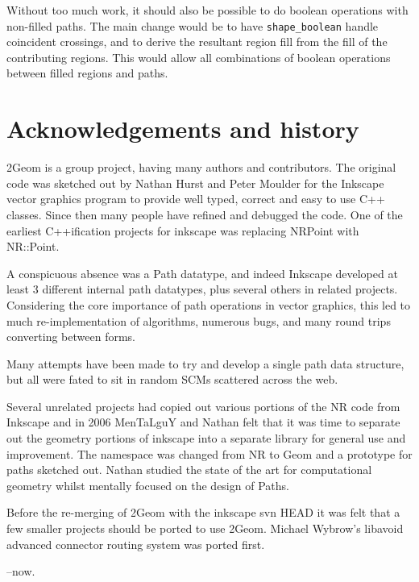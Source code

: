 \documentclass[openany]{book}
\begin{document}
Without too much work, it should also be possible to do boolean operations with non-filled paths. The main change would be to have \verb|shape_boolean| handle coincident crossings, and to derive the resultant region fill from the fill of the contributing regions. This would allow all combinations of boolean operations between filled regions and paths. 

\chapter{Acknowledgements and history}

2Geom is a group project, having many authors and contributors.  The
original code was sketched out by Nathan Hurst and Peter Moulder for
the Inkscape vector graphics program to provide well typed, correct
and easy to use C++ classes.  Since then many people have refined and
debugged the code.  One of the earliest C++ification projects for
inkscape was replacing NRPoint with NR::Point.

A conspicuous absence was a Path datatype, and indeed Inkscape
developed at least 3 different internal path datatypes, plus several
others in related projects.  Considering the core importance of path
operations in vector graphics, this led to much re-implementation of
algorithms, numerous bugs, and many round trips converting between
forms.

Many attempts have been made to try and develop a single path data
structure, but all were fated to sit in random SCMs scattered across
the web.

Several unrelated projects had copied out various portions of the NR
code from Inkscape and in 2006 MenTaLguY and Nathan felt that it was
time to separate out the geometry portions of inkscape into a
separate library for general use and improvement.  The namespace was
changed from NR to Geom and a prototype for paths sketched out.
Nathan studied the state of the art for computational geometry whilst
mentally focused on the design of Paths.

Before the re-merging of 2Geom with the inkscape svn HEAD it was felt
that a few smaller projects should be ported to use 2Geom.  Michael
Wybrow's libavoid advanced connector routing system was ported first.

--now.

\pagebreak
\end{document}
